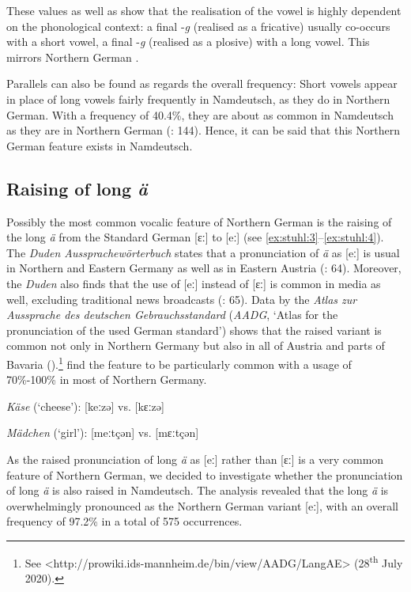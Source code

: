 \documentclass[output=paper]{langsci/langscibook}
\begin{document}
These values as well as  show that the realisation of the vowel is highly dependent on the phonological context: a final -\textit{g} (realised as a fricative) usually co-occurs with a short vowel, a final -\textit{g} (realised as a plosive) with a long vowel. This mirrors Northern German \citep[77]{elmentaler_varietatendynamik_2008}.

Parallels can also be found as regards the overall frequency: Short vowels appear in place of long vowels fairly frequently in Namdeutsch, as they do in Northern German. With a frequency of 40.4\%, they are about as common in Namdeutsch as they are in Northern German (\citealt{elmentaler_norddeutscher_2015}: 144). Hence, it can be said that this Northern German feature exists in Namdeutsch.

\subsection{Raising of long \textit{ä}}
\label{sec:stuhl:4.2}

Possibly the most common vocalic feature of Northern German is the raising of the long \textit{ä} from the Standard German [ɛː] to [eː] (see \ref{ex:stuhl:3}--\ref{ex:stuhl:4}). The \textit{Duden Aussprachewörterbuch} states that a pronunciation of \textit{ä} as [eː] is usual in Northern and Eastern Germany as well as in Eastern Austria (\citealt{kleiner_duden_2015}: 64). Moreover, the \textit{Duden} also finds that the use of [eː] instead of [ɛː] is common in media as well, excluding traditional news broadcasts (\citealt{kleiner_duden_2015}: 65). Data by the \textit{Atlas zur Aussprache des deutschen Gebrauchsstandard} (\textit{AADG}, ‘Atlas for the pronunciation of the used German standard’) shows that the raised variant is common not only in Northern Germany but also in all of Austria and parts of Bavaria (\citealt{kleiner_atlas_2011}).\footnote{See <http://prowiki.ids-mannheim.de/bin/view/AADG/LangAE> (28\textsuperscript{th} July 2020).} \citet[104]{elmentaler_norddeutscher_2015} find the feature to be particularly common with a usage of 70\%-100\% in most of Northern Germany. 

 

\ea 
\label{ex:stuhl:3}
{\textit{Käse}} (‘cheese’): {[keːzə]} vs. {[kɛːzə]} 
\z
 

\ea 
\label{ex:stuhl:4}
{\textit{Mädchen}} (‘girl’): {[meːtçən]} vs. {[}mɛːtçən{]}
 \z

As the raised pronunciation of long \textit{ä} as [eː] rather than [ɛː] is a very common feature of Northern German, we decided to investigate whether the pronunciation of long \textit{ä} is also raised in Namdeutsch. The analysis revealed that the long \textit{ä} is overwhelmingly pronounced as the Northern German variant [eː], with an overall frequency of 97.2\% in a total of 575 occurrences.
\end{document}
